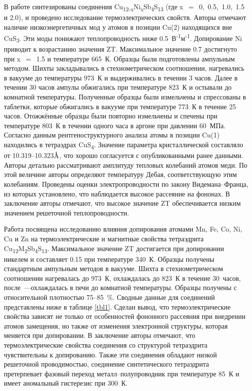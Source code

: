 В работе \cite{Suekuni_2013} синтезированы  соединения Cu\textsubscript{12-x}Ni\textsubscript{x}Sb\textsubscript{4}S\textsubscript{13} (где x~$=$~0,~0.5,~1.0,~1.5 и 2.0), и проведено исследование термоэлектрических свойств. Авторы отмечают наличие низкоэнергетичных мод у атомов в позиции Cu(2) находящихся вне CuS\textsubscript{3}. Эти моды понижают теплопроводность ниже 0.5~В\textsuperscript{-1}м\textsuperscript{-1}. Допирование Ni приводит к возрастанию значения ZT. Максимальное значение 0.7 достигнуто при x~$=$~1.5 и температуре 665~К. Образцы были подготовлены ампульным методом. Шихты закладывались в стехиометрическом соотношении, нагревались в вакууме до температуры 973~К и выдерживались в течении 3 часов. Далее в течении 30 часов ампулы обжигались при температуре 823~К и остывали до комнатной температуры. Полученные образцы были измельчены и спрессованы в таблетки, которые обжигались в вакууме при температуре 773~К в течение 25 часов. Отожжённые образцы были повторно измельчены и спечены при температуре 803~К в течении одного часа в аргоне при давлении 60~МПа. Согласно данным рентгеноструктурного анализа атомы в позиции Cu(1) находились в тетраэдрах CuS\textsubscript{4}. Значение параметра кристаллической составляло от 10.319--10.323$\mbox{\normalfont\AA}$, что хорошо согласуется с опубликованными ранее данными. Авторы детально рассматривают амплитуду тепловых колебаний атомов меди. По этой величине авторы определяют температуру Дебая, соответствующую этим колебаниям. Проведены оценки электропроводности по закону Видемана--Франца, из которых установлено, что наблюдается высокое рассеяние на фононах. В заключение авторы отмечают, что высокое значение ZT обеспечивается низким значением решеточной теплопроводности.

Работа \cite{Suekuni2012} посвящена исследованию влияния допирования атомами Mn, Fe, Co, Ni, Cu и Zn на термоэлектрические и магнитные свойства тетраэдрита Cu\textsubscript{12}M\textsubscript{2}Sb\textsubscript{4}S\textsubscript{13}.
Максимальное значение ZT достигается при допировании никелем и составляет 0.15 при температуре 340~К.
Образцы получены стандартным ампульным методов в вакууме. Шихта в стехиометрическом соотношении нагревалась до 973~К, охлаждалась до 823~К в течение 30~часов, после~---охлаждалась в печи до комнатной температуры.
Образцы получены с относительной плотностью 75--85~\%.
Сводные данные для соединений представлены ниже в таблице \ref{tbl1}.
Сделан вывод, что термоэлектрические свойства зависят не только от особенностей фононного рассеяния при внедрении атомов замещения, но также от изменения электронной структуры, которая меняется при допировании.
В заключение авторы отмечают, что термоэлектрические свойства соединения со структурой тетраэдрита чувствительны к допированию. Также эти соединения обладают низкой решеточной проводимостью, соединение синтетического тетраэдрита претерпевает фазовый переход металл--полупроводник при температуре 85~К и имеет аномальный гистерезис при 300~К.


